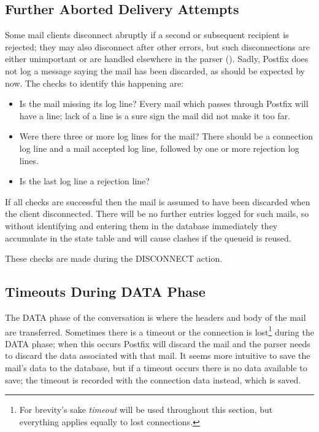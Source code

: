 \subsection{Further Aborted Delivery Attempts}

Some mail clients disconnect abruptly if a second or subsequent recipient
is rejected; they may also disconnect after other errors, but such
disconnections are either unimportant or are handled elsewhere in the
parser ().  Sadly, Postfix does not
log a message saying the mail has been discarded, as should be expected by
now.  The checks to identify this happening are:

\begin{itemize}

    \item Is the mail missing its  log line?  Every mail
        which passes through Postfix will have a  line;
        lack of a  line is a sure sign the mail did not
        make it too far.

    \item Were there three or more  log lines for the mail?
        There should be a connection log line and a mail accepted log line,
        followed by one or more rejection log lines.

    \item Is the last  log line a rejection line?

\end{itemize}

If all checks are successful then the mail is assumed to have been
discarded when the client disconnected.  There will be no further entries
logged for such mails, so without identifying and entering them in the
database immediately they accumulate in the state table and will cause
clashes if the queueid is reused.

These checks are made during the DISCONNECT action.

\newpage{} %

\subsection{Timeouts During DATA Phase}

\label{timeouts during data phase}

The DATA phase of the  conversation is where the headers and
body of the mail are transferred.  Sometimes there is a timeout or the
connection is lost\footnote{For brevity's sake \textit{timeout\/} will be
used throughout this section, but everything applies equally to lost
connections.} during the DATA phase; when this occurs Postfix will discard
the mail and the parser needs to discard the data associated with that
mail.  It seems more intuitive to save the mail's data to the database, but
if a timeout occurs there is no data available to save; the timeout is
recorded with the connection data instead, which is saved.

